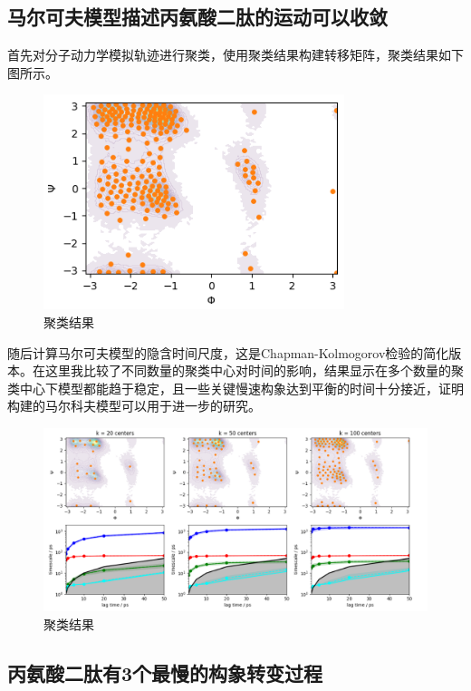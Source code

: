 \documentclass[a4paper]{article}
\begin{document}
\begin{CJK}{UTF8}{gbsn}
	

	\subsection{马尔可夫模型描述丙氨酸二肽的运动可以收敛}

	首先对分子动力学模拟轨迹进行聚类，使用聚类结果构建转移矩阵，聚类结果如下图所示。
\begin{figure}[H]
\centering
\includegraphics[scale=0.75]{clus.png}
\caption{聚类结果}
\end{figure}

	随后计算马尔可夫模型的隐含时间尺度，这是Chapman-Kolmogorov检验的简化版本。在这里我比较了不同数量的聚类中心对时间的影响，结果显示在多个数量的聚类中心下模型都能趋于稳定，且一些关键慢速构象达到平衡的时间十分接近，证明构建的马尔科夫模型可以用于进一步的研究。


\begin{figure}[H]
\centering
\includegraphics[scale=0.55]{impied.png}
\caption{聚类结果}
\end{figure}


	\subsection{丙氨酸二肽有3个最慢的构象转变过程}






\end{CJK}
\end{document}
